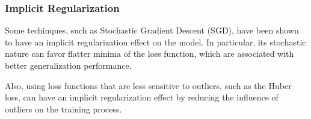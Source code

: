\subsubsection{Implicit Regularization}
Some techinques, such as Stochastic Gradient Descent (SGD), have been shown to have an implicit regularization effect on the model.
In particular, its stochastic nature can favor flatter minima of the loss function, which are associated with better generalization performance.

Also, using loss functions that are less sensitive to outliers, such as the Huber loss, can have an implicit regularization effect by reducing the influence of outliers on the training process.